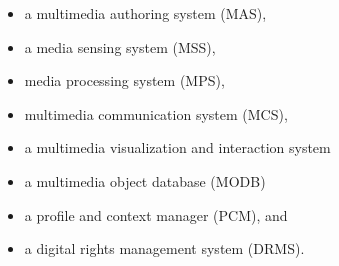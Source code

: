  	 \begin{itemize}
 		\item a multimedia authoring system (MAS), 
 		\item a media sensing system (MSS),
 		\item media processing system (MPS),
 		\item multimedia communication system (MCS),
 		\item a multimedia visualization and interaction system 	
 		\item a multimedia object database (MODB)
 		\item a profile and context manager (PCM), and 
 		\item a digital rights management system (DRMS).
 	\end{itemize}


